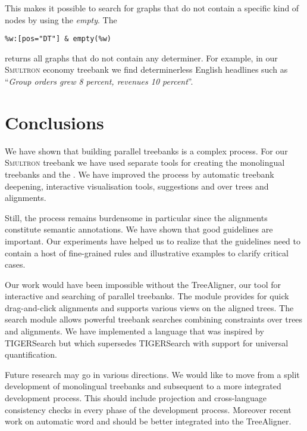\documentclass[output=paper]{LSP/langsci}
\begin{document}
This makes it possible to search for graphs that do not contain a specific kind of nodes by using the  \textit{empty}. The 

\ea
\begin{lstlisting}
%w:[pos="DT"] & empty(%w)
\end{lstlisting}
\z

\noindent returns all graphs that do not contain any determiner. For example, in our S\textsc{mul\-tron} economy treebank we find determinerless English headlines such as ``\textit{Group orders grew 8 percent, revenues 10 percent}''. 

\section{Conclusions}\label{sec:volk:4}

We have shown that building parallel treebanks is a complex process. For our \textsc{Smultron} treebank we have used separate tools for creating the monolingual treebanks and the . We have improved the process by automatic treebank deepening, interactive visualisation tools,  suggestions and  over trees and alignments. 

Still, the process remains burdensome in particular since the alignments constitute semantic annotations. We have shown that good  guidelines are important. Our experiments have helped us to realize that the guidelines need to contain a host of fine-grained  rules and illustrative examples to clarify critical cases. 

Our  work would have been impossible without the TreeAligner, our tool for interactive  and searching of parallel treebanks. The  module provides for quick drag-and-click alignments and supports various views on the aligned trees. The search module allows powerful treebank searches combining constraints over trees and alignments. We have implemented a  language that was inspired by TIGERSearch but which supersedes TIGERSearch with support for universal quantification. 

Future research may go in various directions. We would like to move from a split development of monolingual treebanks and subsequent  to a more integrated development process. This should include  projection and cross-language consistency checks in every phase of the development process. Moreover recent work on automatic word and  should be better integrated into the TreeAligner. 
\end{document}

